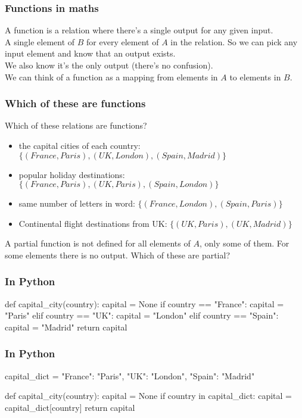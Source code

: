 \documentclass{beamer}
\begin{document}
\begin{frame}[fragile]
\frametitle{Functions in maths}
A function is a relation where there's a single output for
any given input. \\
A single element of $B$ for every element of $A$ in the relation.
So we can pick any input element and know that an output
exists. \\
We also know it's the only output (there's no confusion). \\
We can think of a function as a mapping from elements in $A$
to elements in $B$.

\end{frame}


\begin{frame}[fragile]
\frametitle{Which of these are functions}

Which of these relations are functions?
 
\begin{itemize} 
\item the capital cities of each country: $\{(France, Paris), (UK,
  London), (Spain, Madrid) \}$
\item popular holiday destinations: $\{ (France, Paris), (UK, Paris),
  (Spain, London) \}$
\item same number of letters in word: $\{ (France, London), (Spain,
  Paris) \}$
\item Continental flight destinations from UK: $\{ (UK, Paris), (UK, Madrid) \}$
\end{itemize}
\pause
A partial function is not defined for all elements of $A$, only some
of them. For some elements there is no output. Which of these are partial?
\end{frame}

\begin{frame}[fragile]
\frametitle{In Python}
\begin{code}
def capital_city(country):
   capital = None
   if country == "France":
      capital = "Paris"
   elif country == "UK":
      capital = "London"
   elif country == "Spain":
      capital = "Madrid"
   return capital
\end{code}
\end{frame}

\begin{frame}[fragile]
\frametitle{In Python}
\begin{code}
capital_dict = { "France": "Paris", "UK": "London", "Spain": "Madrid" }

def capital_city(country):
   capital = None
   if country in capital_dict:
      capital = capital_dict[country]
   return capital
\end{code}
\end{frame}
\end{document}
